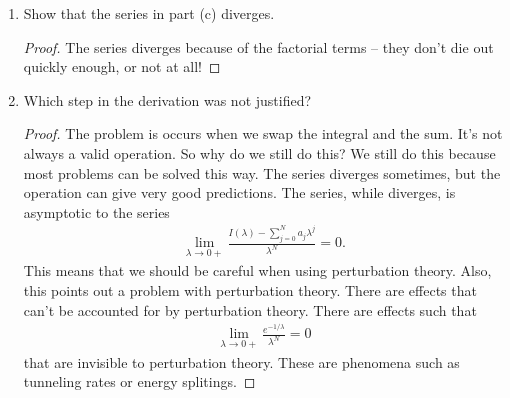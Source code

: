 \documentclass{book}
\theoremstyle{definition}
\newcommand{\f}[2]{\frac{#1}{#2}}
\begin{document}
\begin{enumerate}
	
	
	\item Show that the series in part (c) diverges.
	\begin{proof}
		The series diverges because of the factorial terms -- they don't die out quickly enough, or not at all! 
	\end{proof}
	
	
	\item Which step in the derivation was not justified?
	\begin{proof}
		The problem is occurs when we swap the integral and the sum. It's not always a valid operation. So why do we still do this? We still do this because most problems can be solved this way. The series diverges sometimes, but the operation can give very good predictions. The series, while diverges, is asymptotic to the series
		\begin{align}
		\lim_{\lambda \to 0+} \f{ I(\lambda) - \sum^N_{j=0}a_j \lambda^j}{\lambda^N} = 0.
		\end{align}
		This means that we should be careful when using perturbation theory. Also, this points out a problem with perturbation theory. There are effects that can't be accounted for by perturbation theory. There are effects such that
		\begin{align}
		\lim_{\lambda \to 0+} \f{e^{-1/\lambda}}{\lambda^N} = 0
		\end{align}
		that are invisible to perturbation theory. These are phenomena such as tunneling rates or energy splitings.
	\end{proof}
	
\end{enumerate}
\end{document}
